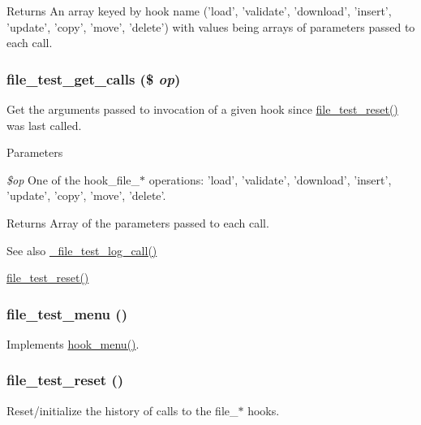 \begin{DoxyReturn}{Returns}
An array keyed by hook name ('load', 'validate', 'download', 'insert', 'update', 'copy', 'move', 'delete') with values being arrays of parameters passed to each call. 
\end{DoxyReturn}
\hypertarget{file__test_8module_a43842b551a9a076a33290c02b9c567b0}{
\subsubsection[{file\_\-test\_\-get\_\-calls}]{\setlength{\rightskip}{0pt plus 5cm}file\_\-test\_\-get\_\-calls (\$ {\em op})}}
\label{file__test_8module_a43842b551a9a076a33290c02b9c567b0}
Get the arguments passed to invocation of a given hook since \hyperlink{file__test_8module_ac3231cdae85b5f6631a201a2f56e9d84}{file\_\-test\_\-reset()} was last called.


\begin{DoxyParams}{Parameters}
\item[{\em \$op}]One of the hook\_\-file\_\-$\ast$ operations: 'load', 'validate', 'download', 'insert', 'update', 'copy', 'move', 'delete'.\end{DoxyParams}
\begin{DoxyReturn}{Returns}
Array of the parameters passed to each call.
\end{DoxyReturn}
\begin{DoxySeeAlso}{See also}
\hyperlink{file__test_8module_a102b88df111a0197411b9b651e0ef7d5}{\_\-file\_\-test\_\-log\_\-call()} 

\hyperlink{file__test_8module_ac3231cdae85b5f6631a201a2f56e9d84}{file\_\-test\_\-reset()} 
\end{DoxySeeAlso}
\hypertarget{file__test_8module_ad70b9163a9b65cb4aecdd0e82a964925}{
\subsubsection[{file\_\-test\_\-menu}]{\setlength{\rightskip}{0pt plus 5cm}file\_\-test\_\-menu ()}}
\label{file__test_8module_ad70b9163a9b65cb4aecdd0e82a964925}
Implements \hyperlink{group__hooks_ga5c95244fea59b25666e409759e133ded}{hook\_\-menu()}. \hypertarget{file__test_8module_ac3231cdae85b5f6631a201a2f56e9d84}{
\subsubsection[{file\_\-test\_\-reset}]{\setlength{\rightskip}{0pt plus 5cm}file\_\-test\_\-reset ()}}
\label{file__test_8module_ac3231cdae85b5f6631a201a2f56e9d84}
Reset/initialize the history of calls to the file\_\-$\ast$ hooks.

